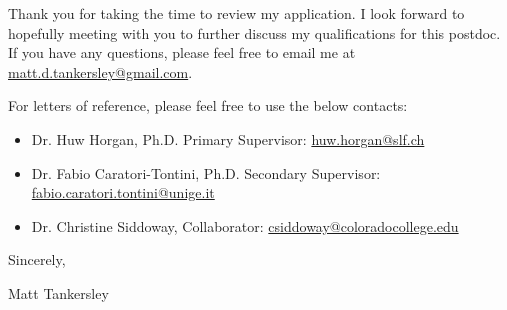 \documentclass{ExpressiveCoverLetter}
\begin{document}
Thank you for taking the time to review my application. I look forward
to hopefully meeting with you to further discuss my
qualifications for this postdoc. If you have any questions, please feel free to
email me at \href{mailto:matt.d.tankersley@gmail.com}{matt.d.tankersley@gmail.com}.


For letters of reference, please feel free to use the below contacts:
\begin{itemize}
    \item Dr. Huw Horgan, Ph.D. Primary Supervisor: \href{mailto:huw.horgan@slf.ch}{huw.horgan@slf.ch}
    \item Dr. Fabio Caratori-Tontini, Ph.D. Secondary Supervisor: \href{mailto:fabio.caratori.tontini@unige.it}{fabio.caratori.tontini@unige.it}
    \item Dr. Christine Siddoway, Collaborator: \href{mailto:csiddoway@coloradocollege.edu}{csiddoway@coloradocollege.edu}
\end{itemize}


Sincerely,

\vspace{.15in}

Matt Tankersley
\end{document}
